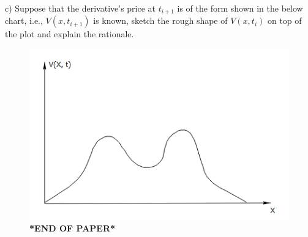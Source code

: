 \documentclass[11pt,a4paper,hidelinks,fleqn]{article}            %
\begin{document}
c) Suppose that the derivative's price at $t_{i+1}$ is of the form shown in the below chart,
i.e., $V(x, t_{i+1})$ is known, 
sketch the rough shape of $V(x, t_{i})$ on top of the plot and explain the rationale.
\begin{figure}[h]
\includegraphics[scale=0.9]{./6c} \\
\vspace{1cm}
\textbf{*END OF PAPER*}
\end{figure}
\end{document}
